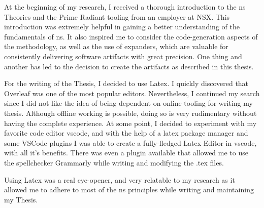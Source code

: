 At the beginning of my research, I received a thorough introduction to the \gls{ns}
Theories and the Prime Radiant tooling from an employer at NSX. This introduction was
extremely helpful in gaining a better understanding of the fundamentals of \gls{ns}. It
also inspired me to consider the code-generation aspects of the methodology, as well as
the use of expanders, which are valuable for consistently delivering software artifacts
with great precision. One thing and another has led to the decision to create the
artifacts as described in this thesis.

For the writing of the Thesis, I decided to use Latex. I quickly discovered that Overleaf
was one of the most popular editors. Nevertheless, I continued my search since I did not
like the idea of being dependent on online tooling for writing my thesis. Although offline
working is possible, doing so is very rudimentary without having the complete experience. At
some point, I decided to experiment with my favorite code editor \gls{vscode}, and
with the help of a latex package manager and some VSCode plugins I was able to create
a fully-fledged Latex Editor in \gls{vscode}, with all it's benefits. There was even a
plugin available that allowed me to use the spellchecker Grammarly while writing and
modifying the .tex files.

Using Latex was a real eye-opener, and very relatable to my research as it allowed me to
adhere to most of the \gls{ns} principles while writing and maintaining my Thesis.
